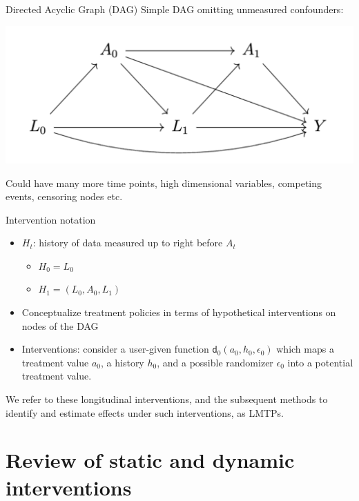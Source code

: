 \documentclass[
  10pt,
  ignorenonframetext,
]{beamer}
\providecommand{\tightlist}{%
  \setlength{\itemsep}{0pt}\setlength{\parskip}{0pt}}\usepackage{longtable,booktabs,array}
\begin{document}
\begin{frame}{Directed Acyclic Graph (DAG)}
\protect\hypertarget{directed-acyclic-graph-dag}{}
Simple DAG omitting unmeasured confounders:

\includegraphics{img/dag.png}

Could have many more time points, high dimensional variables, competing
events, censoring nodes etc.
\end{frame}

\begin{frame}{Intervention notation}
\protect\hypertarget{intervention-notation}{}
\begin{itemize}
\item
  \(H_t\): history of data measured up to right before \(A_t\)

  \begin{itemize}
  \tightlist
  \item
    \(H_0=L_0\)
  \item
    \(H_1 = (L_0, A_0, L_1)\)
  \end{itemize}
\item
  Conceptualize treatment policies in terms of hypothetical
  interventions on nodes of the DAG
\item
  Interventions: consider a user-given function
  \(\mathsf{d}_0(a_0, h_0, \epsilon_0)\) which maps a treatment value
  \(a_0\), a history \(h_0\), and a possible randomizer \(\epsilon_0\)
  into a potential treatment value.
\end{itemize}

We refer to these longitudinal interventions, and the subsequent methods
to identify and estimate effects under such interventions, as LMTPs.
\end{frame}

\hypertarget{review-of-static-and-dynamic-interventions}{%
\section{Review of static and dynamic
interventions}\label{review-of-static-and-dynamic-interventions}}
\end{document}
